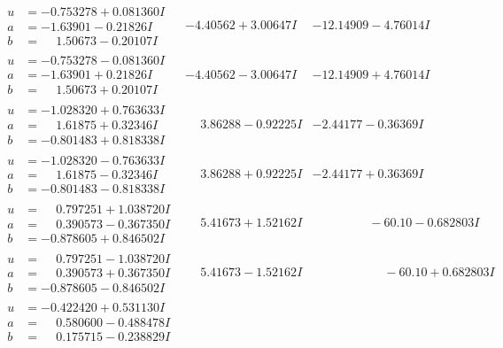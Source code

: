 \documentclass[1p]{elsarticle_modified}
\theoremstyle{definition}
\begin{document}
$$\begin{array}{c|c|c}
\begin{aligned}
u &= -0.753278 + 0.081360 I \\
a &= -1.63901 - 0.21826 I \\
b &= \phantom{-}1.50673 - 0.20107 I\end{aligned}
 & -4.40562 + 3.00647 I & -12.14909 - 4.76014 I \\ \hline\begin{aligned}
u &= -0.753278 - 0.081360 I \\
a &= -1.63901 + 0.21826 I \\
b &= \phantom{-}1.50673 + 0.20107 I\end{aligned}
 & -4.40562 - 3.00647 I & -12.14909 + 4.76014 I \\ \hline\begin{aligned}
u &= -1.028320 + 0.763633 I \\
a &= \phantom{-}1.61875 + 0.32346 I \\
b &= -0.801483 + 0.818338 I\end{aligned}
 & \phantom{-}3.86288 - 0.92225 I & -2.44177 - 0.36369 I \\ \hline\begin{aligned}
u &= -1.028320 - 0.763633 I \\
a &= \phantom{-}1.61875 - 0.32346 I \\
b &= -0.801483 - 0.818338 I\end{aligned}
 & \phantom{-}3.86288 + 0.92225 I & -2.44177 + 0.36369 I \\ \hline\begin{aligned}
u &= \phantom{-}0.797251 + 1.038720 I \\
a &= \phantom{-}0.390573 - 0.367350 I \\
b &= -0.878605 + 0.846502 I\end{aligned}
 & \phantom{-}5.41673 + 1.52162 I & \phantom{-0.000000 }      -6
0. 10   - 0.682803 I \\ \hline\begin{aligned}
u &= \phantom{-}0.797251 - 1.038720 I \\
a &= \phantom{-}0.390573 + 0.367350 I \\
b &= -0.878605 - 0.846502 I\end{aligned}
 & \phantom{-}5.41673 - 1.52162 I & \phantom{-0.000000 -}     -6
0. 10   + 0.682803 I \\ \hline\begin{aligned}
u &= -0.422420 + 0.531130 I \\
a &= \phantom{-}0.580600 - 0.488478 I \\
b &= \phantom{-}0.175715 - 0.238829 I\end{aligned}

\end{array}$$
\end{document}
